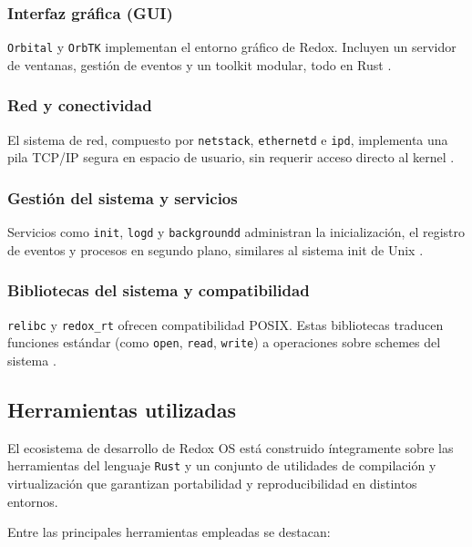 \subsubsection*{Interfaz gráfica (GUI)}
\texttt{Orbital} y \texttt{OrbTK} implementan el entorno gráfico de Redox. 
Incluyen un servidor de ventanas, gestión de eventos y un toolkit modular, todo en Rust \citep{redox_graphics_windowing}.

\subsubsection*{Red y conectividad}
El sistema de red, compuesto por \texttt{netstack}, \texttt{ethernetd} e \texttt{ipd}, implementa una pila TCP/IP segura en espacio de usuario, sin requerir acceso directo al kernel \citep{redox_components}.

\subsubsection*{Gestión del sistema y servicios}
Servicios como \texttt{init}, \texttt{logd} y \texttt{backgroundd} administran la inicialización, el registro de eventos y procesos en segundo plano, similares al sistema init de Unix \citep{redox_user_space}.

\subsubsection*{Bibliotecas del sistema y compatibilidad}
\texttt{relibc} y \texttt{redox\_rt} ofrecen compatibilidad POSIX. 
Estas bibliotecas traducen funciones estándar (como \texttt{open}, \texttt{read}, \texttt{write}) a operaciones sobre schemes del sistema \citep{redox_programs_libraries}.


\subsection{Herramientas utilizadas}

El ecosistema de desarrollo de Redox OS está construido íntegramente sobre las herramientas del lenguaje \texttt{Rust} y un conjunto de utilidades de compilación y virtualización que garantizan portabilidad y reproducibilidad en distintos entornos.  

Entre las principales herramientas empleadas se destacan:

